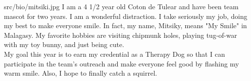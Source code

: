 \begin{Bio}

  {src/bio/mitsiki.jpg}
  {%
  I am a 4 1/2 year old Coton de Tulear and have been team mascot for
  two years. I am a wonderful distraction. I take seriously my job,
  doing my best to make everyone smile. In fact, my name, Mitsiky, means
  "My Smile" in Malagasy. My favorite hobbies are visiting chipmunk
  holes, playing tug-of-war with my toy bunny, and just being cute. \vspace{3mm} \\
  My goal this year is to earn my credential as a Therapy Dog so that I
  can participate in the team’s outreach and make everyone feel good by
  flashing my warm smile. Also, I hope to finally catch a squirrel.
  }
  
\end{Bio}

